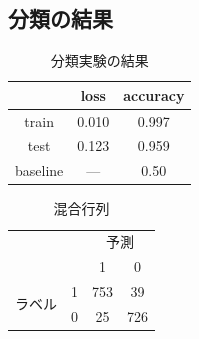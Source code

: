 \documentclass[twocolumn]{jarticle}     %
\begin{document}
\subsection{分類の結果}

\begin{table}[tb]
  \begin{center}
    \caption{分類実験の結果}
    \begin{tabular}{ccc}
      \hline
       & loss & accuracy \\
      \hline
      train & 0.010 & 0.997 \\
      test & 0.123 & 0.959 \\
      baseline & --- & 0.50 \\
      \hline
    \end{tabular}
    \label{tab:result}
  \end{center}
\end{table}

\begin{table}[tb]
  \begin{center}
    \caption{混合行列}
    \begin{tabular}{|c|c|c|c|}
    \hline
    \multicolumn{2}{|c|}{\multirow{2}{*}{\textbf{}}} & \multicolumn{2}{c|}{予測} \\ \cline{3-4}
    \multicolumn{2}{|c|}{}                           & 1               & 0              \\ \hline
    \multirow{2}{*}{ラベル}              & 1             & 753              & 39              \\ \cline{2-4}
                                     & 0             & 25              & 726             \\ \hline
    \end{tabular}
    \label{tab:conmat}
  \end{center}
\end{table}
\end{document}
